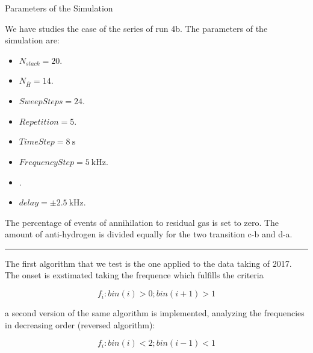 \documentclass[9pt]{beamer}
\begin{document}
\begin{frame}{Parameters of the Simulation}

We have studies the case of the series of run 4b. The parameters of the simulation are:
\begin{itemize}
\item $N_{stack} = 20$.
\item $N_{\overline{H}} = 14$.
\item $SweepSteps = 24$.
\item $Repetition = 5$.
\item $TimeStep = \SI{8}{\second}$
\item $FrequencyStep = \SI{5}{\kilo \hertz}$.
\item {}.
\item $delay = \pm \SI{2.5}{\kilo \hertz}$.
\end{itemize}

The percentage of events of annihilation to residual gas is set to zero. The amount of anti-hydrogen is divided equally for the two transition c-b and d-a.
\vspace{2pt}
\hrule 
\vspace{2pt}
The first algorithm that we test is the one applied to the data taking of 2017. The onset is exstimated taking the frequence which fulfills the criteria

\begin{equation}
f_{i} : bin(i) > 0; bin(i + 1) > 1
\end{equation}

a second version of the same algorithm is implemented, analyzing the frequencies in decreasing order (reversed algorithm):

\begin{equation}
f_{i} : bin(i) < 2; bin(i - 1) < 1
\end{equation}

\end{frame}
\end{document}
